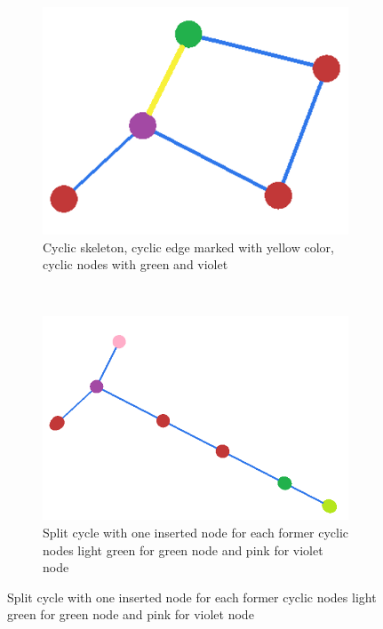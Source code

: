 \begin{figure}[ht]
        \centering
        \begin{subfigure}[b]{0.4\linewidth}
        \centering
			\includegraphics[width=0.9\linewidth]{images/cyclic_skeletons_1}
            \caption{Cyclic skeleton, cyclic edge marked with yellow color, cyclic nodes with green and violet}
            \label{fig:cycle_skeleton}
        \end{subfigure}%
        ~ %
        \begin{subfigure}[b]{0.4\linewidth}
        \centering
			\includegraphics[width=0.9\linewidth]{images/cyclic_skeletons_2}
            \caption{Split cycle with one inserted node for each former cyclic nodes light green for green node and pink for violet node}
            \label{fig:cycle_break}
        \end{subfigure}

\end{figure}
